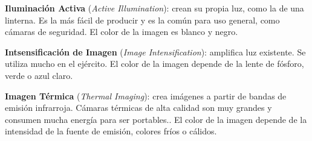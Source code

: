 \textbf{Iluminación Activa} (\textit{Active Illumination}): crean su propia luz, como la de una linterna. Es la más fácil de producir y es la común para uso general, como cámaras de seguridad. El color de la imagen es blanco y negro.

\textbf{Intsensificación de Imagen} (\textit{Image Intensification}): amplifica luz existente. Se utiliza mucho en el ejército. El color de la imagen depende de la lente de fósforo, verde o azul claro.

\textbf{Imagen Térmica} (\textit{Thermal Imaging}): crea imágenes a partir de bandas de emisión infrarroja. Cámaras térmicas de alta calidad son muy grandes y consumen mucha energía para ser portables.. El color de la imagen depende de la intensidad de la fuente de emisión, colores fríos o cálidos.
